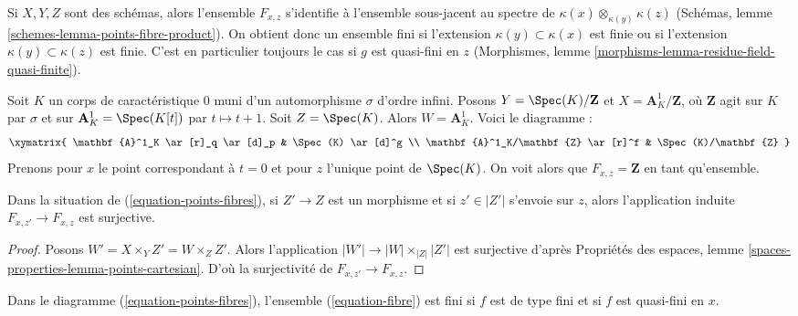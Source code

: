 \begin{example}
\label{example-schemes}
Si $X, Y, Z$ sont des schémas, alors l'ensemble $F_{x, z}$ s'identifie à
l'ensemble sous-jacent au spectre de
$\kappa(x) \otimes_{\kappa(y)} \kappa(z)$
(Schémas, lemme \ref{schemes-lemma-points-fibre-product}). On obtient donc un
ensemble fini si l'extension $\kappa(y) \subset \kappa(x)$ est finie ou si
l'extension $\kappa(y) \subset \kappa(z)$ est finie. C'est en particulier
toujours le cas si $g$ est quasi-fini en $z$ (Morphismes, lemme
\ref{morphisms-lemma-residue-field-quasi-finite}).
\end{example}

\begin{example}
\label{example-not-finite}
Soit $K$ un corps de caractéristique $0$ muni d'un automorphisme $\sigma$
d'ordre infini. Posons $Y = \Spec(K)/\mathbf{Z}$ et
$X = \mathbf{A}^1_K/\mathbf{Z}$, où $\mathbf{Z}$ agit sur $K$ par $\sigma$
et sur $\mathbf{A}^1_K = \Spec(K[t])$ par $t \mapsto t + 1$.
Soit $Z = \Spec(K)$. Alors $W = \mathbf{A}^1_K$. Voici le diagramme :
$$
\xymatrix{
\mathbf{A}^1_K \ar[r]_q \ar[d]_p & \Spec(K) \ar[d]^g \\
\mathbf{A}^1_K/\mathbf{Z} \ar[r]^f & \Spec(K)/\mathbf{Z}
}
$$
Prenons pour $x$ le point correspondant à $t = 0$ et pour $z$ l'unique point
de $\Spec(K)$. On voit alors que $F_{x, z} = \mathbf{Z}$ en tant qu'ensemble.
\end{example}

\begin{lemma}
\label{lemma-surjective-on-fibres}
Dans la situation de (\ref{equation-points-fibres}), si $Z' \to Z$ est un
morphisme et si $z' \in |Z'|$ s'envoie sur $z$, alors l'application induite
$F_{x, z'} \to F_{x, z}$ est surjective.
\end{lemma}

\begin{proof}
Posons $W' = X \times_Y Z' = W \times_Z Z'$. Alors l'application
$|W'| \to |W| \times_{|Z|} |Z'|$ est surjective d'après
Propriétés des espaces, lemme
\ref{spaces-properties-lemma-points-cartesian}.
D'où la surjectivité de $F_{x, z'} \to F_{x, z}$.
\end{proof}

\begin{lemma}
\label{lemma-qf-and-qc-finite-fibre}
Dans le diagramme (\ref{equation-points-fibres}), l'ensemble
(\ref{equation-fibre}) est fini si $f$ est de type fini et si $f$ est
quasi-fini en $x$.
\end{lemma}

